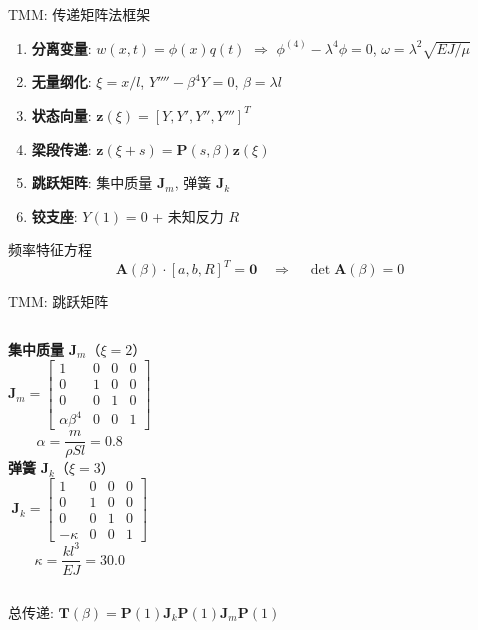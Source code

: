 \documentclass[12pt,aspectratio=169]{ctexbeamer}
\begin{document}
\begin{frame}{TMM: 传递矩阵法框架}
  \begin{enumerate}
    \item \textbf{分离变量}: $w(x,t)=\phi(x)q(t)$ $\Rightarrow$
          $\phi^{(4)}-\lambda^4\phi=0$, \; $\omega=\lambda^2\sqrt{EJ/\mu}$
    \item \textbf{无量纲化}: $\xi=x/l$, $Y''''-\beta^4Y=0$, $\beta=\lambda l$
    \item \textbf{状态向量}: $\mathbf{z}(\xi)=[Y, Y', Y'', Y''']^T$
    \item \textbf{梁段传递}: $\mathbf{z}(\xi+s)=\mathbf{P}(s,\beta)\mathbf{z}(\xi)$
    \item \textbf{跳跃矩阵}: 集中质量 $\mathbf{J}_m$, 弹簧 $\mathbf{J}_k$
    \item \textbf{铰支座}: $Y(1)=0$ + 未知反力 $R$
  \end{enumerate}

  \begin{block}{频率特征方程}
    \[
    \mathbf{A}(\beta)\cdot[a,b,R]^T=\mathbf{0}
    \quad\Longrightarrow\quad
    \boxed{\det\mathbf{A}(\beta)=0}
    \]
  \end{block}
\end{frame}

\begin{frame}{TMM: 跳跃矩阵}
  \begin{columns}[T]
      \textbf{集中质量} $\mathbf{J}_m$（$\xi=2$）
      \[
      \mathbf{J}_m = \begin{bmatrix}
      1 & 0 & 0 & 0 \\
      0 & 1 & 0 & 0 \\
      0 & 0 & 1 & 0 \\
      \alpha\beta^4 & 0 & 0 & 1
      \end{bmatrix}
      \]
      \vspace{-0.5em}
      \[
      \alpha = \frac{m}{\rho S l} = 0.8
      \]
      \textbf{弹簧} $\mathbf{J}_k$（$\xi=3$）
      \[
      \mathbf{J}_k = \begin{bmatrix}
      1 & 0 & 0 & 0 \\
      0 & 1 & 0 & 0 \\
      0 & 0 & 1 & 0 \\
      -\kappa & 0 & 0 & 1
      \end{bmatrix}
      \]
      \vspace{-0.5em}
      \[
      \kappa = \frac{kl^3}{EJ} = 30.0
      \]
  \end{columns}

  \vspace{1em}
  \begin{center}
    \small 总传递: $\mathbf{T}(\beta)=\mathbf{P}(1)\mathbf{J}_k\mathbf{P}(1)\mathbf{J}_m\mathbf{P}(1)$
  \end{center}
\end{frame}
\end{document}
